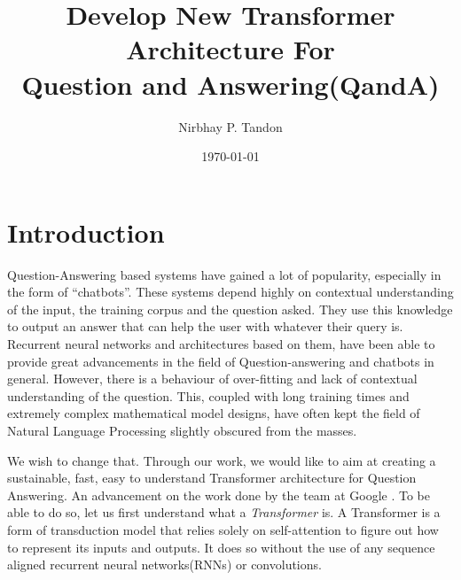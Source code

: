 \documentclass[12pt]{report}
\begin{document}
    \title{Develop New Transformer Architecture For \\ Question and Answering(QandA)}

    \author{Nirbhay P. Tandon}

    \date{\vfill \monthyeardate\today}
        \maketitle


    \newpage
    \newpage
    \tableofcontents
    \newpage
    \listoffigures
    \chapter{\centering Introduction}\label{c1}
    Question-Answering based systems have gained a lot of popularity, especially in the form of ``chatbots''. These systems depend highly on contextual understanding of the input, the training corpus and the question asked. They use this knowledge to output an answer that can help the user with whatever their query is. Recurrent neural networks and architectures based on them, have been able to provide great advancements in the field of Question-answering and chatbots in general. However, there is a behaviour of over-fitting and lack of contextual understanding of the question. This, coupled with long training times and extremely complex mathematical model designs, have often kept the field of Natural Language Processing slightly obscured from the masses.

    We wish to change that. Through our work, we would like to aim at creating a sustainable, fast, easy to understand Transformer architecture for Question Answering. An advancement on the work done by the team at Google \citep{atayl}. To be able to do so, let us first understand what a \textit{Transformer} is.
    A Transformer is a form of transduction model that relies solely on self-attention to figure out how to represent its inputs and outputs. It does so without the use of any sequence aligned recurrent neural networks(RNNs) or convolutions.
\end{document}
